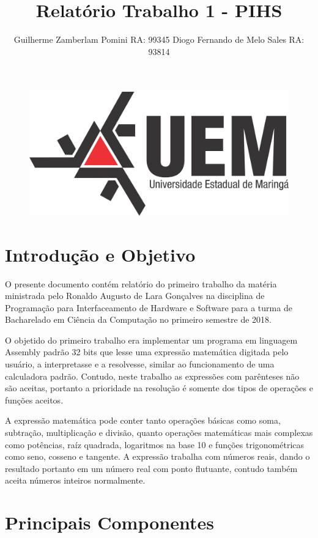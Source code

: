\documentclass[12pt]{article}
\title{Relatório Trabalho 1 - PIHS}
\author{Guilherme Zamberlam Pomini  RA: 99345\inst{1} Diogo Fernando de Melo Sales RA: 93814 \inst{1}}
\begin{document}
 

\maketitle

\begin{figure}[H]
\centering
\includegraphics[width=\textwidth]{Imagens/logo.png}
\end{figure}


\section*{Introdução e Objetivo}

O presente documento contém relatório do primeiro trabalho da matéria ministrada pelo Ronaldo Augusto de Lara Gonçalves na disciplina de Programação para Interfaceamento de Hardware e Software para a turma de Bacharelado em Ciência da Computação no primeiro semestre de 2018.

O objetido do primeiro trabalho era implementar um programa em linguagem Assembly padrão 32 bits que lesse uma expressão matemática digitada pelo usuário, a interpretasse e a resolvesse, similar ao funcionamento de uma calculadora padrão. Contudo, neste trabalho as expressões com parênteses não são aceitas, portanto a prioridade na resolução é somente dos tipos de operações e funções aceitos.

A expressão matemática pode conter tanto operações básicas como soma, subtração, multiplicação e divisão, quanto operações matemáticas mais complexas como potências, raíz quadrada, logaritmos na base 10 e funções trigonométricas como seno, cosseno e tangente. A expressão trabalha com números reais, dando o resultado portanto em um número real com ponto flutuante, contudo também aceita números inteiros normalmente.

\section*{Principais Componentes}
\end{document}
